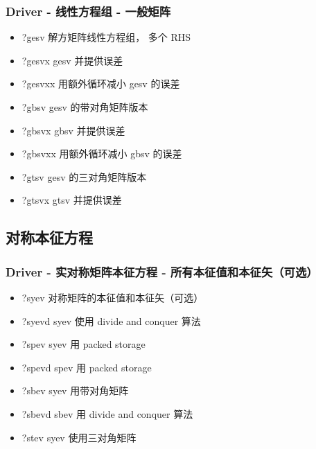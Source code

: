 \subsubsection{Driver - 线性方程组 - 一般矩阵}
\begin{itemize}
\item ?gesv 解方矩阵线性方程组， 多个 RHS
\item ?gesvx gesv 并提供误差
\item ?gesvxx 用额外循环减小 gesv 的误差
\item ?gbsv gesv 的带对角矩阵版本
\item ?gbsvx gbsv 并提供误差
\item ?gbsvxx 用额外循环减小 gbsv 的误差
\item ?gtsv gesv 的三对角矩阵版本
\item ?gtsvx gtsv 并提供误差
\end{itemize}


\subsection{对称本征方程}
\subsubsection{Driver - 实对称矩阵本征方程 - 所有本征值和本征矢（可选）}
\begin{itemize}
\item ?syev 对称矩阵的本征值和本征矢（可选）
\item ?syevd syev 使用 divide and conquer 算法
\item ?spev syev 用 packed storage
\item ?spevd spev 用 packed storage
\item ?sbev syev 用带对角矩阵
\item ?sbevd sbev 用 divide and conquer 算法
\item ?stev syev 使用三对角矩阵
\end{itemize}
